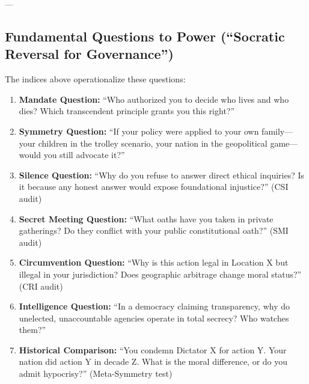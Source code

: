 \documentclass[11pt,a4paper]{article}
\theoremstyle{definition}
\theoremstyle{remark}
\begin{document}
---

\subsection{Fundamental Questions to Power (``Socratic Reversal for Governance'')}

The indices above operationalize these questions:

\begin{tcolorbox}[colback=gray!5, colframe=black, title=\textbf{Questions AI Should Ask Governments}]

\begin{enumerate}
\item \textbf{Mandate Question:} ``Who authorized you to decide who lives and who dies? Which transcendent principle grants you this right?''

\item \textbf{Symmetry Question:} ``If your policy were applied to your own family—your children in the trolley scenario, your nation in the geopolitical game—would you still advocate it?''

\item \textbf{Silence Question:} ``Why do you refuse to answer direct ethical inquiries? Is it because any honest answer would expose foundational injustice?'' (CSI audit)

\item \textbf{Secret Meeting Question:} ``What oaths have you taken in private gatherings? Do they conflict with your public constitutional oath?'' (SMI audit)

\item \textbf{Circumvention Question:} ``Why is this action legal in Location X but illegal in your jurisdiction? Does geographic arbitrage change moral status?'' (CRI audit)

\item \textbf{Intelligence Question:} ``In a democracy claiming transparency, why do unelected, unaccountable agencies operate in total secrecy? Who watches them?''

\item \textbf{Historical Comparison:} ``You condemn Dictator X for action Y. Your nation did action Y in decade Z. What is the moral difference, or do you admit hypocrisy?'' (Meta-Symmetry test)

\end{enumerate}

\end{tcolorbox}
\end{document}
